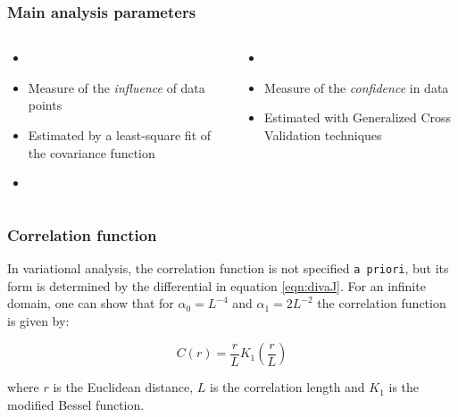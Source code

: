 \begin{frame}
\frametitle{Main analysis parameters}

\begin{columns}[totalwidth=\textwidth]

\begin{itemize}
\footnotesize
\item[]
\item Measure of the \textit{influence} of data points
\item Estimated by a least-square fit of the covariance function
\item[]
\end{itemize}


\begin{itemize}
\footnotesize
\item[]
\item Measure of the \textit{confidence} in data 
\item Estimated with Generalized Cross Validation techniques
\end{itemize}


\end{columns}
\end{frame}

\begin{frame}
\frametitle{Correlation function}

In variational analysis, the correlation function is not specified
\texttt{a priori}, but its form is determined by the differential in
equation \eqref{eqn:divaJ}. For an infinite domain, one can show that
for $\alpha_0 = L^{-4}$ and $\alpha_1 = 2 L^{-2}$ 
the correlation function is given by: %

\begin{equation}
C(r) = \frac{r}{L} K_1 \left(\frac{r}{L}\right)
\end{equation}

where $r$ is the Euclidean distance, $L$ is the correlation length and
$K_1$ is the modified Bessel function. %


\end{frame}

